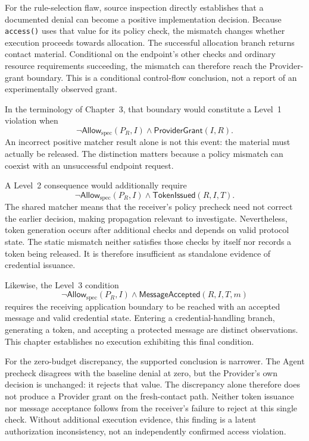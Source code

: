 For the rule-selection flaw, source inspection directly establishes that a
documented denial can become a positive implementation decision. Because
\texttt{access()} uses that value for its policy check, the mismatch changes
whether execution proceeds towards allocation. The successful allocation
branch returns contact material. Conditional on the endpoint's other checks
and ordinary resource requirements succeeding, the mismatch can therefore
reach the Provider-grant boundary. This is a conditional control-flow
conclusion, not a report of an experimentally observed grant.

In the terminology of Chapter~3, that boundary would constitute a Level~1
violation when
\[
  \neg\mathsf{Allow}_{\mathrm{spec}}(P_R,I)
  \land \mathsf{ProviderGrant}(I,R).
\]
An incorrect positive matcher result alone is not this event: the material
must actually be released. The distinction matters because a policy mismatch
can coexist with an unsuccessful endpoint request.

A Level~2 consequence would additionally require
\[
  \neg\mathsf{Allow}_{\mathrm{spec}}(P_R,I)
  \land \mathsf{TokenIssued}(R,I,T).
\]
The shared matcher means that the receiver's policy precheck need not correct
the earlier decision, making propagation relevant to investigate. Nevertheless,
token generation occurs after additional checks and depends on valid protocol
state. The static mismatch neither satisfies those checks by itself nor
records a token being released. It is therefore insufficient as standalone
evidence of credential issuance.

Likewise, the Level~3 condition
\[
  \neg\mathsf{Allow}_{\mathrm{spec}}(P_R,I)
  \land \mathsf{MessageAccepted}(R,I,T,m)
\]
requires the receiving application boundary to be reached with an accepted
message and valid credential state. Entering a credential-handling branch,
generating a token, and accepting a protected message are distinct
observations. This chapter establishes no execution exhibiting this final
condition.

For the zero-budget discrepancy, the supported conclusion is narrower. The
Agent precheck disagrees with the baseline denial at zero, but the Provider's
own decision is unchanged: it rejects that value. The discrepancy alone
therefore does not produce a Provider grant on the fresh-contact path.
Neither token issuance nor message acceptance follows from the receiver's
failure to reject at this single check. Without additional execution
evidence, this finding is a latent authorization inconsistency, not an
independently confirmed access violation.

